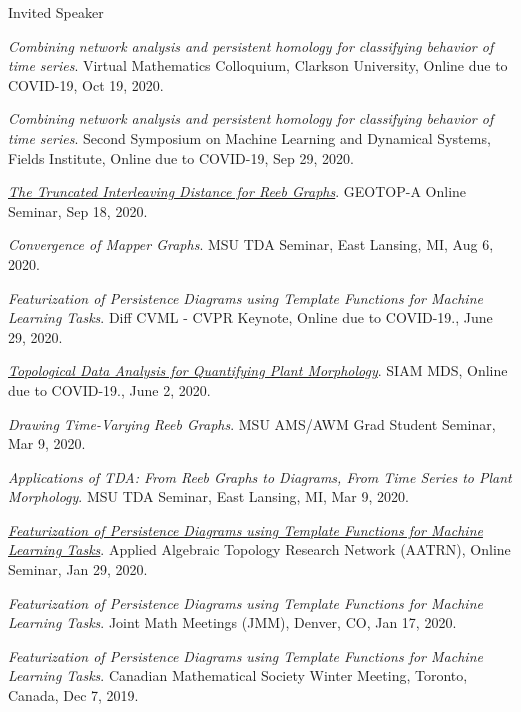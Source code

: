 \documentclass{resume} %
\begin{document}
\begin{rSection}{Invited Speaker}
\begin{etaremune}
\item\emph{Combining network analysis and persistent homology for classifying behavior of time series}. Virtual Mathematics Colloquium, Clarkson University, Online due to COVID-19, Oct 19, 2020. 

\item\emph{Combining network analysis and persistent homology for classifying behavior of time series}. Second Symposium on Machine Learning and Dynamical Systems, Fields Institute, Online due to COVID-19, Sep 29, 2020. 

\item\emph{\href{https://youtu.be/nyO4KQTmwzU}{The Truncated Interleaving Distance for Reeb Graphs}}. GEOTOP-A Online Seminar, Sep 18, 2020. 

\item\emph{Convergence of Mapper Graphs}. MSU TDA Seminar, East Lansing, MI, Aug 6, 2020. 

\item\emph{Featurization of Persistence Diagrams using Template Functions for Machine Learning Tasks}. Diff CVML - CVPR Keynote, Online due to COVID-19., June 29, 2020. 

\item\emph{\href{https://youtu.be/2mscXkz_o4A}{Topological Data Analysis for Quantifying Plant Morphology}}. SIAM MDS, Online due to COVID-19., June 2, 2020. 

\item\emph{Drawing Time-Varying Reeb Graphs}. MSU AMS/AWM Grad Student Seminar, Mar 9, 2020. 

\item\emph{Applications of TDA: From Reeb Graphs to Diagrams, From Time Series to Plant Morphology}. MSU TDA Seminar, East Lansing, MI, Mar 9, 2020. 

\item\emph{\href{https://youtu.be/Moh9lF4UVs4}{Featurization of Persistence Diagrams using Template Functions for Machine Learning Tasks}}. Applied Algebraic Topology Research Network (AATRN), Online Seminar, Jan 29, 2020. 

\item\emph{Featurization of Persistence Diagrams using Template Functions for Machine Learning Tasks}. Joint Math Meetings (JMM), Denver, CO, Jan 17, 2020. 

\item\emph{Featurization of Persistence Diagrams using Template Functions for Machine Learning Tasks}. Canadian Mathematical Society Winter Meeting, Toronto, Canada, Dec 7, 2019. 


\end{etaremune}
\end{rSection}
\end{document}
